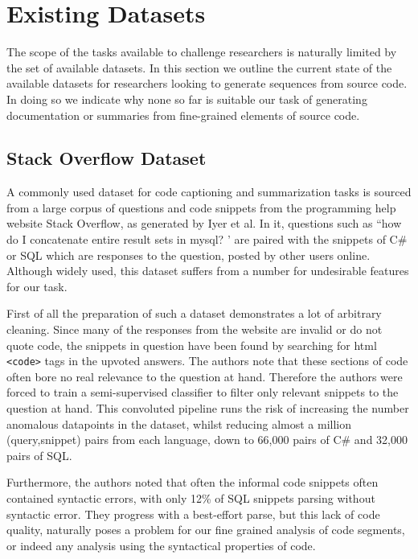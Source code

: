 \section{Existing Datasets}
\label{sec:existing_datasets}

The scope of the tasks available to challenge researchers is naturally limited by the set of available datasets.
In this section we outline the current state of the available datasets for researchers looking to generate sequences from source code. In doing so we indicate why none so far is suitable our task of generating documentation or summaries from fine-grained elements of source code.

\subsection{Stack Overflow Dataset}

A commonly used dataset for code captioning and summarization tasks is sourced from a large corpus of questions and code snippets from the programming help website Stack Overflow, as generated by Iyer et al\cite{iyer_summarizing_2016}. In it, questions such as ``how do I concatenate entire result sets in mysql? ' are paired with the snippets of C\# or SQL which are responses to the question, posted by other users online.
Although widely used, this dataset suffers from a number for undesirable features for our task. 

First of all the preparation of such a dataset demonstrates a lot of arbitrary cleaning.
Since many of the responses from the website are invalid or do not quote code, the snippets in question have been found by searching for html \texttt{<code>} tags in the upvoted answers. 
The authors note that these sections of code often bore no real relevance to the question at hand. Therefore the authors were forced to train a semi-supervised classifier to filter only relevant snippets to the question at hand.
This convoluted pipeline runs the risk of increasing the number anomalous datapoints in the dataset, whilst reducing almost a million (query,snippet) pairs from each language, down to 66,000 pairs  of C\# and 32,000 pairs of SQL.

Furthermore, the authors noted that often the informal code snippets often contained syntactic errors, with only 12\% of SQL snippets parsing without syntactic error. They progress with a best-effort parse, but this
 lack of code quality, naturally poses a problem for our fine grained analysis of code segments, or indeed any analysis using the syntactical properties of code.

